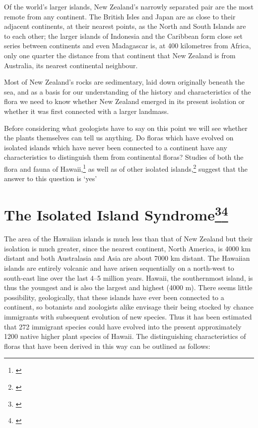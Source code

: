 Of the world's larger islands, New Zealand's narrowly separated pair are the most remote from any continent.
The British Isles and Japan are as close to their adjacent continents, at their nearest points, as the North and South Islands are to each other; the larger islands of Indonesia and the Caribbean form close set series between continents and even Madagascar is, at 400 kilometres from Africa, only one quarter the distance from that continent that New Zealand is from Australia, its nearest continental neighbour.

Most of New Zealand's rocks are sedimentary, laid down originally beneath the sea, and as a basis for our understanding of the history and characteristics of the flora we need to know whether New Zealand emerged in its present isolation or whether it was first connected with a larger landmass.

Before considering what geologists have to say on this point we will see whether the plants themselves can tell us anything.
Do floras which have evolved on isolated islands which have never been connected to a continent have any characteristics to distinguish them from continental floras? Studies of both the flora and fauna of Hawai{\okina}i,\footnote{\cite{carlquist1970hawaii}} as well as of other isolated islands,\footnote{\cite{carlquist1965island}} suggest that the answer to this question is `yes'

\section[The Isolated Island Syndrome]{The Isolated Island Syndrome\footnote{\cite{ehrendorfer1979reproductive}}\footnote{\cite{lloyd1985progress}}}

The area of the Hawaiian islands is much less than that of New Zealand but their isolation is much greater, since the nearest continent, North America, is 4000 km distant and both Australasia and Asia are about 7000 km distant.
The Hawaiian islands are entirely volcanic and have arisen sequentially on a north-west to south-east line over the last 4--5 million years.
Hawai{\okina}i, the southernmost island, is thus the youngest and is also the largest and highest (4000 m).
There seems little possibility, geologically, that these islands have ever been connected to a continent, so botanists and zoologists alike envisage their being stocked by chance immigrants with subsequent evolution of new species.
Thus it has been estimated that 272 immigrant species could have evolved into the present approximately 1200 native higher plant species of Hawai{\okina}i.
The distinguishing characteristics of floras that have been derived in this way can be outlined as follows:


